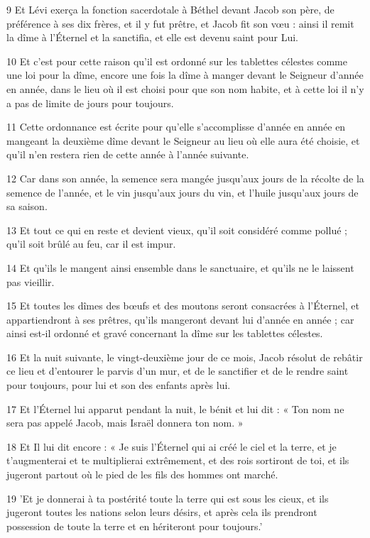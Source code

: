 \par 9 Et Lévi exerça la fonction sacerdotale à Béthel devant Jacob son père, de préférence à ses dix frères, et il y fut prêtre, et Jacob fit son vœu : ainsi il remit la dîme à l'Éternel et la sanctifia, et elle est devenu saint pour Lui.
\par 10 Et c'est pour cette raison qu'il est ordonné sur les tablettes célestes comme une loi pour la dîme, encore une fois la dîme à manger devant le Seigneur d'année en année, dans le lieu où il est choisi pour que son nom habite, et à cette loi il n'y a pas de limite de jours pour toujours.
\par 11 Cette ordonnance est écrite pour qu'elle s'accomplisse d'année en année en mangeant la deuxième dîme devant le Seigneur au lieu où elle aura été choisie, et qu'il n'en restera rien de cette année à l'année suivante.
\par 12 Car dans son année, la semence sera mangée jusqu'aux jours de la récolte de la semence de l'année, et le vin jusqu'aux jours du vin, et l'huile jusqu'aux jours de sa saison.
\par 13 Et tout ce qui en reste et devient vieux, qu'il soit considéré comme pollué ; qu'il soit brûlé au feu, car il est impur.
\par 14 Et qu'ils le mangent ainsi ensemble dans le sanctuaire, et qu'ils ne le laissent pas vieillir.
\par 15 Et toutes les dîmes des bœufs et des moutons seront consacrées à l'Éternel, et appartiendront à ses prêtres, qu'ils mangeront devant lui d'année en année ; car ainsi est-il ordonné et gravé concernant la dîme sur les tablettes célestes.
\par 16 Et la nuit suivante, le vingt-deuxième jour de ce mois, Jacob résolut de rebâtir ce lieu et d'entourer le parvis d'un mur, et de le sanctifier et de le rendre saint pour toujours, pour lui et son des enfants après lui.
\par 17 Et l'Éternel lui apparut pendant la nuit, le bénit et lui dit : « Ton nom ne sera pas appelé Jacob, mais Israël donnera ton nom. »
\par 18 Et Il lui dit encore : « Je suis l'Éternel qui ai créé le ciel et la terre, et je t'augmenterai et te multiplierai extrêmement, et des rois sortiront de toi, et ils jugeront partout où le pied de les fils des hommes ont marché.
\par 19 'Et je donnerai à ta postérité toute la terre qui est sous les cieux, et ils jugeront toutes les nations selon leurs désirs, et après cela ils prendront possession de toute la terre et en hériteront pour toujours.'
